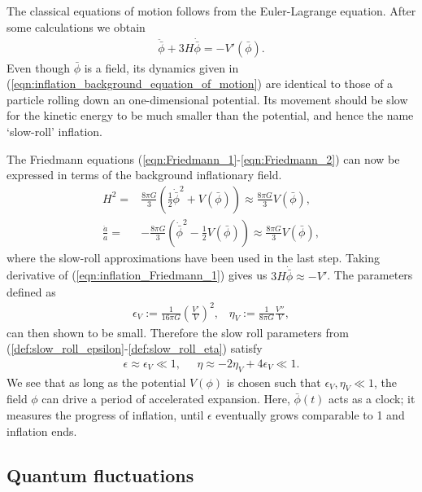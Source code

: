 The classical equations of motion follows from the Euler-Lagrange equation. After some calculations we obtain
\begin{align}
	\ddot{\bar{\phi}} + 3H\dot{\bar{\phi}} = - V'(\bar{\phi}). 	  \label{eqn:inflation_background_equation_of_motion}
\end{align}
Even though $\bar{\phi}$ is a field, its dynamics given in (\ref{eqn:inflation_background_equation_of_motion}) are identical to those of a particle rolling down an one-dimensional potential. Its movement should be slow for the kinetic energy to be much smaller than the potential, and hence the name `slow-roll' inflation.

The Friedmann equations (\ref{eqn:Friedmann_1}-\ref{eqn:Friedmann_2}) can now be expressed in terms of the background inflationary field.
\begin{align}
	H^2 =& \frac{8\pi G}{3} \left( \frac{1}{2} \dot{\bar{\phi}}^2 + V(\bar{\phi}) \right) \approx \frac{8\pi G}{3} V(\bar{\phi}), \label{eqn:inflation_Friedmann_1} \\
	\frac{\ddot{a}}{a} =& -\frac{8\pi G}{3} \left( \dot{\bar{\phi}}^2 - \frac{1}{2} V(\bar{\phi}) \right) \approx \frac{8\pi G}{3} V(\bar{\phi}), \label{eqn:inflation_Friedmann_2}
\end{align}
where the slow-roll approximations have been used in the last step. Taking derivative of (\ref{eqn:inflation_Friedmann_1}) gives us $3H\dot{\bar{\phi}} \approx -V'$. The parameters defined as
\begin{align}
	\epsilon_V := \frac{1}{16\pi G} \left( \frac{V'}{V} \right)^2, \;\;\;
	\eta_V := \frac{1}{8\pi G} \frac{V''}{V},
\end{align}
can then shown to be small. Therefore the slow roll parameters from (\ref{def:slow_roll_epsilon}-\ref{def:slow_roll_eta}) satisfy
\begin{align}
	\epsilon \approx \epsilon_V \ll 1, \;\;\;\;\; \eta \approx -2\eta_V + 4\epsilon_V \ll 1.
\end{align}
We see that as long as the potential $V(\phi)$ is chosen such that $\epsilon_V, \eta_V \ll 1$, the field $\phi$ can drive a period of accelerated expansion. Here, $\bar{\phi}(t)$ acts as a clock; it measures the progress of inflation, until $\epsilon$ eventually grows comparable to 1 and inflation ends.

\subsection{Quantum fluctuations}

